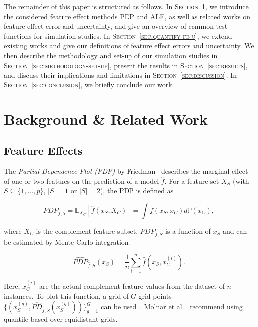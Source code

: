 \documentclass[runningheads]{llncs}
\begin{document}
The remainder of this paper is structured as follows. In
\textsc{Section~\ref{sec:related-works}}, we introduce the considered feature
effect methods PDP and ALE, as well as related works on feature effect error
and uncertainty, and give an overview of common test functions for simulation
studies. In \textsc{Section~\ref{sec:quantify-fe-u}}, we extend existing works
and give our definitions of feature effect errors and uncertainty. We then
describe the methodology and set-up of our simulation studies in
\textsc{Section~\ref{sec:methodology-set-up}}, present the results in
\textsc{Section~\ref{sec:results}}, and discuss their implications and
limitations in \textsc{Section~\ref{sec:discussion}}. In
\textsc{Section~\ref{sec:conclusion}}, we briefly conclude our work.

\section{Background \& Related Work}\label{sec:related-works}

\subsection{Feature Effects}

The \textit{Partial Dependence Plot (PDP)} by
Friedman~\cite{friedman_greedy_2001} describes the marginal effect of one or
two features on the prediction of a model $\hat f$. For a feature set $X_S$
(with $S \subseteq \{1,\ldots,p\}$, $|S| = 1$ or $|S| = 2$), the PDP is defined
as

\begin{equation}
    PDP_{\hat f, S} = \mathbb{E}_{X_C}[\hat{f}(x_S, X_C)] = \int f(x_S, x_C)d\mathbb{P}(x_C),
\end{equation}

\noindent where $X_C$ is the complement feature subset. $PDP_{\hat f, S}$ is a
function of $x_S$ and can be estimated by Monte Carlo integration:

\begin{equation}\label{eq:pdp-estimate}
    \widehat{PDP}_{\hat f, S}(x_S) = \frac{1}{n} \sum_{i=1}^{n} \hat{f}(x_S, x_C^{(i)}).
\end{equation}

\noindent Here, $x_C^{(i)}$ are the actual complement feature values from the dataset of $n$ instances.
To plot this function, a grid of $G$ grid points
$\{(x_S^{(g)}, \widehat{PD}_{\hat f, S}(x_S^{(g)}))\}_{g=1}^G$ can be used~\cite{molnar_relating_2023}.
Molnar et al.~\cite{molnar_general_2022} recommend using quantile-based over equidistant grids.
\end{document}
